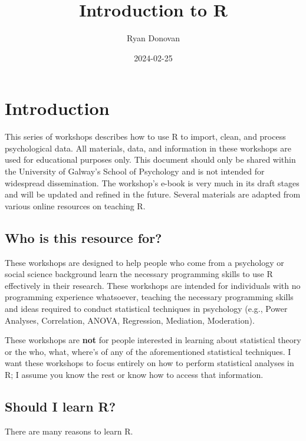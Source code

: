 \documentclass[
]{book}
\title{Introduction to R}
\author{Ryan Donovan}
\date{2024-02-25}
\begin{document}
\maketitle

{
\setcounter{tocdepth}{1}
\tableofcontents
}
\hypertarget{introduction}{%
\chapter{\texorpdfstring{\textbf{Introduction}}{Introduction}}\label{introduction}}

This series of workshops describes how to use R to import, clean, and process psychological data. All materials, data, and information in these workshops are used for educational purposes only. This document should only be shared within the University of Galway's School of Psychology and is not intended for widespread dissemination. The workshop's e-book is very much in its draft stages and will be updated and refined in the future. Several materials are adapted from various online resources on teaching R.

\hypertarget{who-is-this-resource-for}{%
\section{Who is this resource for?}\label{who-is-this-resource-for}}

These workshops are designed to help people who come from a psychology or social science background learn the necessary programming skills to use R effectively in their research. These workshops are intended for individuals with no programming experience whatsoever, teaching the necessary programming skills and ideas required to conduct statistical techniques in psychology (e.g., Power Analyses, Correlation, ANOVA, Regression, Mediation, Moderation).

These workshops are \textbf{not} for people interested in learning about statistical theory or the who, what, where's of any of the aforementioned statistical techniques. I want these workshops to focus entirely on how to perform statistical analyses in R; I assume you know the rest or know how to access that information.

\hypertarget{should-i-learn-r}{%
\section{Should I learn R?}\label{should-i-learn-r}}

There are many reasons to learn R.
\end{document}
